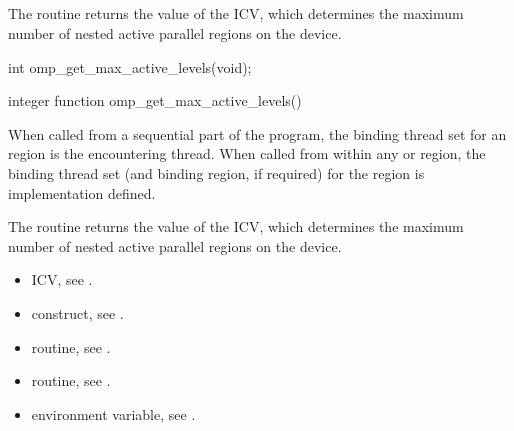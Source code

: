 \subsection{}
\label{subsec:omp_get_max_active_levels}
\summary
The  routine returns the value of the
 ICV, which determines the maximum number 
of nested active parallel regions on the device.

\format
\begin{ccppspecific}
\begin{ompcFunction}
int omp_get_max_active_levels(void);
\end{ompcFunction}
\end{ccppspecific}

\begin{fortranspecific}
\begin{ompfFunction}
integer function omp_get_max_active_levels()
\end{ompfFunction}
\end{fortranspecific}

\binding
When called from a sequential part of the program, the binding thread 
set for an  region is the encountering 
thread. When called from within any  or  
region, the binding thread set (and binding region, if required) for the 
 region is implementation defined.

\effect
The  routine returns the value of the 
 ICV, which determines the maximum number of 
nested active parallel regions on the device.

\crossreferences
\begin{itemize}
\item {} ICV, see
.

\item {} construct, see
.

\item {} routine, see
.

\item {} routine, see
.

\item {} environment variable, see
.
\end{itemize}




